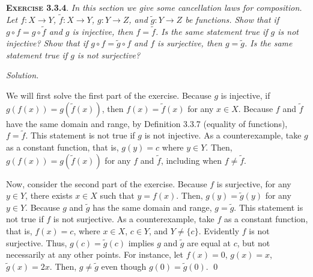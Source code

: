 \documentclass[12pt]{article}
\theoremstyle{remark}
\newenvironment{exer}[2]{
    \noindent \setlength{\parskip}{1em}%
    \textsc{\textbf{Exercise #1}}. \textit{#2} \par
    \noindent \textit{Solution.} %
}{\bigskip}
\begin{document}
\begin{exer}{3.3.4}{
    In this section we give some cancellation laws for composition.
    Let $f : X \to Y$, $\tilde{f} : X \to Y$, $g : Y \to Z$, and $\tilde{g} : Y \to Z$ be functions.
    Show that if $g \circ f = g \circ \tilde{f}$ and $g$ is injective, then $f = \tilde{f}$.
    Is the same statement true if $g$ is not injective?
    Show that if $g \circ f = \tilde{g} \circ f$ and $f$ is surjective, then $g = \tilde{g}$.
    Is the same statement true if $g$ is not surjective?
}
    We will first solve the first part of the exercise.
    Because $g$ is injective, if $g(f(x)) = g(\tilde{f}(x))$, then $f(x) = \tilde{f}(x)$ for any $x \in X$.
    Because $f$ and $\tilde{f}$ have the same domain and range, by Definition 3.3.7 (equality of functions), $f = \tilde{f}$.
    This statement is not true if $g$ is not injective.
    As a counterexample, take $g$ as a constant function, that is, $g(y) = c$ where $y \in Y$.
    Then, $g(f(x)) = g(\tilde{f}(x))$ for any $f$ and $\tilde{f}$, including when $f \ne \tilde{f}$.

    Now, consider the second part of the exercise.
    Because $f$ is surjective, for any $y \in Y$, there exists $x \in X$ such that $y = f(x)$.
    Then, $g(y) = \tilde{g}(y)$ for any $y \in Y$.
    Because $g$ and $\tilde{g}$ has the same domain and range, $g = \tilde{g}$.
    This statement is not true if $f$ is not surjective.
    As a counterexample, take $f$ as a constant function, that is, $f(x) = c$, where $x \in X$, $c \in Y$, and $Y \ne \{ c \}$.
    Evidently $f$ is not surjective.
    Thus, $g(c) = \tilde{g}(c)$ implies $g$ and $\tilde{g}$ are equal at $c$, but not necessarily at any other points.
    For instance, let $f(x) = 0$, $g(x) = x$, $\tilde{g}(x) = 2x$.
    Then, $g \ne \tilde{g}$ even though $g(0) = \tilde{g}(0)$. \qed    
\end{exer}
\end{document}
